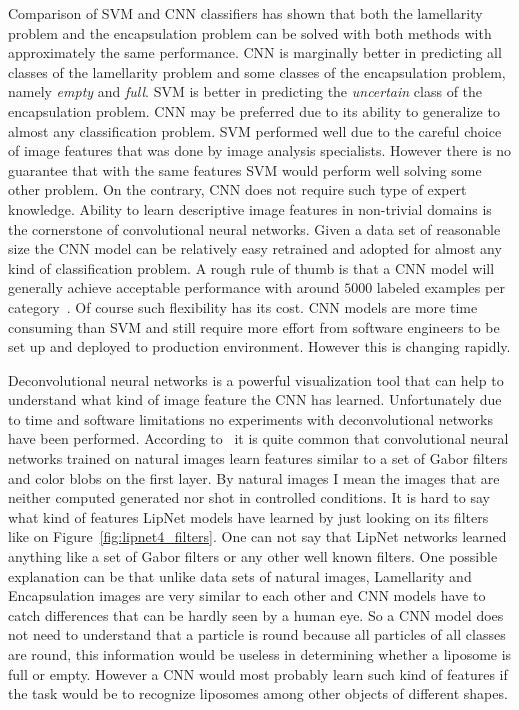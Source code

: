 \documentclass[a4paper, 11pt, table]{article}
\begin{document}
Comparison of SVM and CNN classifiers has shown that both the lamellarity problem and the encapsulation problem can be solved with both methods with approximately the same performance. CNN is marginally better in predicting all classes of the lamellarity problem and some classes of the encapsulation problem, namely \textit{empty} and \textit{full}. SVM is better in predicting the \textit{uncertain} class of the encapsulation problem. CNN may be preferred due to its ability to generalize to almost any classification problem. SVM performed well due to the careful choice of image features that was done by image analysis specialists. However there is no guarantee that with the same features SVM would perform well solving some other problem. On the contrary, CNN does not require such type of expert knowledge. Ability to learn descriptive image features in non-trivial domains is the cornerstone of convolutional neural networks. Given a data set of reasonable size the CNN model can be relatively easy retrained and adopted for almost any kind of classification problem. A rough rule of thumb is that a CNN model will generally achieve acceptable performance with around $5000$ labeled examples per category~\cite{dl_book}. Of course such flexibility has its cost. CNN models are more time consuming than SVM and still require more effort from software engineers to be set up and deployed to production environment. However this is changing rapidly. 

Deconvolutional neural networks is a powerful visualization tool that can help to understand what kind of image feature the CNN has learned. Unfortunately due to time and software limitations no experiments with deconvolutional networks have been performed. According to~\cite{DBLP:journals/corr/YosinskiCBL14} it is quite common that convolutional neural networks trained on natural images learn features similar to a set of Gabor filters and color blobs on the first layer. By natural images I mean the images that are neither computed generated nor shot in controlled conditions. It is hard to say what kind of features LipNet models have learned by just looking on its filters like on Figure~\ref{fig:lipnet4_filters}. One can not say that LipNet networks learned anything like a set of Gabor filters or any other well known filters. One possible explanation can be that unlike data sets of natural images, Lamellarity and Encapsulation images are very similar to each other and CNN models have to catch differences that can be hardly seen by a human eye. So a CNN model does not need to understand that a particle is round because all particles of all classes are round, this information would be useless in determining whether a liposome is full or empty. However a CNN would most probably learn such kind of features if the task would be to recognize liposomes among other objects of different shapes. 
\end{document}
